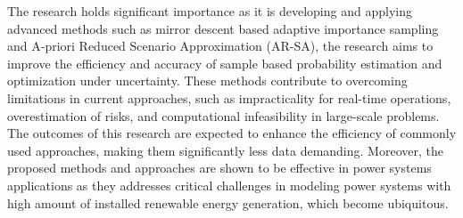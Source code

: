 The research holds significant importance as it is developing and applying advanced methods such as mirror descent based adaptive importance sampling and A-priori Reduced Scenario Approximation (AR-SA), the research aims to improve the efficiency and accuracy of sample based probability estimation and optimization under uncertainty. These methods contribute to overcoming limitations in current approaches, such as impracticality for real-time operations, overestimation of risks, and computational infeasibility in large-scale problems. The outcomes of this research are expected to enhance the efficiency of commonly used approaches, making them significantly less data demanding. Moreover, the proposed methods and approaches are shown to be effective in power systems applications as they addresses critical challenges in modeling power systems with high amount of installed renewable energy generation, which become ubiquitous. %






